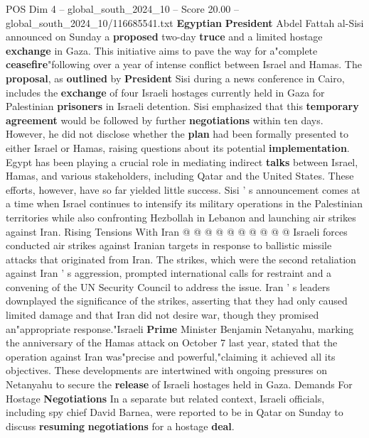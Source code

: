 \begin{textsample}{POS Dim 4 – global\_south\_2024\_10 – Score 20.00 – global\_south\_2024\_10/116685541.txt}  \label{ex:f4_pos_392}
\textbf{Egyptian} \textbf{President} Abdel Fattah al-Sisi announced on Sunday a \textbf{proposed} two-day \textbf{truce} and a limited hostage \textbf{exchange} in Gaza.
This initiative aims to pave the way for a"complete \textbf{ceasefire}"following over a year of intense conflict between Israel and Hamas.
The \textbf{proposal}, as \textbf{outlined} by \textbf{President} Sisi during a news conference in Cairo, includes the \textbf{exchange} of four Israeli hostages currently held in Gaza for Palestinian \textbf{prisoners} in Israeli detention.
Sisi emphasized that this \textbf{temporary} \textbf{agreement} would be followed by further \textbf{negotiations} within ten days.
However, he did not disclose whether the \textbf{plan} had been formally presented to either Israel or Hamas, raising questions about its potential \textbf{implementation}.
Egypt has been playing a crucial role in mediating indirect \textbf{talks} between Israel, Hamas, and various stakeholders, including Qatar and the United States.
These efforts, however, have so far yielded little success.
Sisi ' s announcement comes at a time when Israel continues to intensify its military operations in the Palestinian territories while also confronting Hezbollah in Lebanon and launching air strikes against Iran.
Rising Tensions With Iran @ @ @ @ @ @ @ @ @ @ Israeli forces conducted air strikes against Iranian targets in response to ballistic missile attacks that originated from Iran.
The strikes, which were the second retaliation against Iran ' s aggression, prompted international calls for restraint and a convening of the UN Security Council to address the issue.
Iran ' s leaders downplayed the significance of the strikes, asserting that they had only caused limited damage and that Iran did not desire war, though they promised an"appropriate response."Israeli \textbf{Prime} Minister Benjamin Netanyahu, marking the anniversary of the Hamas attack on October 7 last year, stated that the operation against Iran was"precise and powerful,"claiming it achieved all its objectives.
These developments are intertwined with ongoing pressures on Netanyahu to secure the \textbf{release} of Israeli hostages held in Gaza.
Demands For Hostage \textbf{Negotiations} In a separate but related context, Israeli officials, including spy chief David Barnea, were reported to be in Qatar on Sunday to discuss \textbf{resuming} \textbf{negotiations} for a hostage \textbf{deal}.

\end{textsample}
